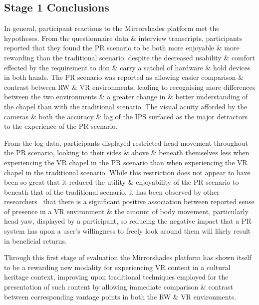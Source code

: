 
\subsection{Stage 1 Conclusions}

In general, participant reactions to the Mirrorshades platform met the hypotheses. From the questionnaire data \& interview transcripts, participants reported that they found the PR scenario to be both more enjoyable \& more rewarding than the traditional scenario, despite the decreased usability \& comfort effected by the requirement to don \& carry a satchel of hardware \& hold devices in both hands. The PR scenario was reported as allowing easier comparison \& contrast between RW \& VR environments, leading to recognising more differences between the two environments \& a greater change in \& better understanding of the chapel than with the traditional scenario. The visual acuity afforded by the cameras \& both the accuracy \& lag of the IPS surfaced as the major detractors to the experience of the PR scenario.

From the log data, participants displayed restricted head movement throughout the PR scenario, looking to their sides \& above \& beneath themselves less when experiencing the VR chapel in the PR scenario than when experiencing the VR chapel in the traditional scenario. While this restriction does not appear to have been so great that it reduced the utility \& enjoyability of the PR scenario to beneath that of the traditional scenario, it has been observed by other researchers~\cite{Slater1998} that there is a significant positive association between reported sense of presence in a VR environment \& the amount of body movement, particularly head yaw, displayed by a participant, so reducing the negative impact that a PR system has upon a user's willingness to freely look around them will likely result in beneficial returns.

Through this first stage of evaluation the Mirrorshades platform has shown itself to be a rewarding new modality for experiencing VR content in a cultural heritage context, improving upon traditional techniques employed for the presentation of such content by allowing immediate comparison \& contrast between corresponding vantage points in both the RW \& VR environments.


